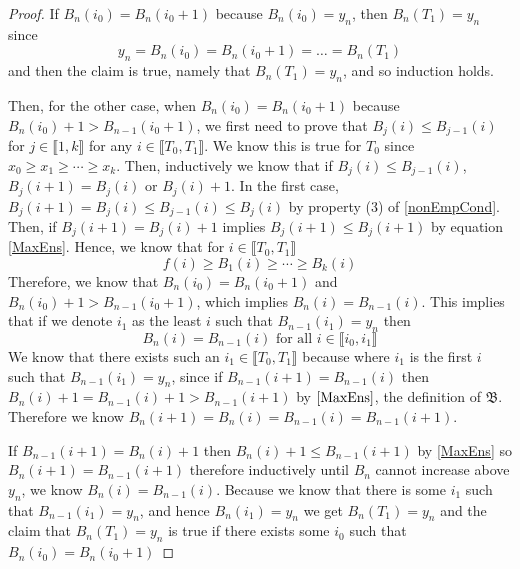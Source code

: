 \begin{proof}
		If $B_{n}(i_0)=B_{n}(i_0+1)$ because $B_{n}(i_0)=y_n$, then $B_n(T_1)=y_n$ since 
		\begin{equation*}y_n=B_n(i_0)=B_n(i_0+1)=\dots=B_n(T_1)\end{equation*}
		and then the claim is true, namely that $B_n(T_1)=y_n$, and so induction holds.
		
		Then, for the other case, when $B_n(i_0)=B_{n}(i_0+1)$ because $B_{n}(i_0)+1>B_{n-1}(i_0+1)$, we first need to prove that $B_j(i)\leq B_{j-1}(i)$ for $j\in \llbracket 1,k\rrbracket$ for any $i\in \llbracket T_0,T_1\rrbracket$. We know this is true for $T_0$ since $x_0\geq x_1\geq \cdots \geq x_k$. Then, inductively we know that if $B_j(i)\leq B_{j-1}(i)$, $B_j(i+1)=B_j(i)$ or $B_j(i)+1$. In the first case, $B_j(i+1)=B_j(i)\leq B_{j-1}(i)\leq B_j(i)$ by property (3) of \ref{nonEmpCond}. Then, if $B_j(i+1)=B_j(i)+1$ implies $B_j(i+1)\leq B_j(i+1)$ by equation \ref{MaxEns}. Hence, we know that for $i\in \llbracket T_0,T_1\rrbracket$\begin{equation}\label{NonEmpPartialIneq}
		f(i)\geq B_1(i)\geq \cdots \geq B_k(i)
		\end{equation}
		Therefore, we know that $B_n(i_0)=B_n(i_0+1)$ and $B_n(i_0)+1>B_{n-1}(i_0+1)$, which implies $B_n(i)=B_{n-1}(i)$. This implies that if we denote $i_1$ as the least $i$ such that $B_{n-1}(i_1)=y_n$ then \begin{equation*}
		B_n(i)=B_{n-1}(i)\text{ for all }i\in \llbracket i_0, i_1\rrbracket
		\end{equation*} We know that there exists such an $i_1\in \llbracket{T_0,T_1}\rrbracket$ because where $i_1$ is the first $i$ such that $B_{n-1}(i_1)=y_n$, since if $B_{n-1}(i+1)=B_{n-1}(i)$ then $B_n(i)+1=B_{n-1}(i)+1>B_{n-1}(i+1)$ by $\ref{MaxEns}$, the definition of $\mathfrak{B}$. Therefore we know $B_n(i+1)=B_n(i)=B_{n-1}(i)=B_{n-1}(i+1)$.
		
		If $B_{n-1}(i+1)=B_n(i)+1$ then $B_n(i)+1\leq B_{n-1}(i+1)$ by \ref{MaxEns} so $B_n(i+1)=B_{n-1}(i+1)$ therefore inductively until $B_n$ cannot increase above $y_n$, we know $B_n(i)=B_{n-1}(i)$. Because we know that there is some $i_1$ such that $B_{n-1}(i_1)=y_n$, and hence $B_n(i_1)=y_n$ we get $B_n(T_1)=y_n$ and the claim that $B_n(T_1)=y_n$ is true if there exists some $i_0$ such that $B_n(i_0)=B_n(i_0+1)$
		

\end{proof}
